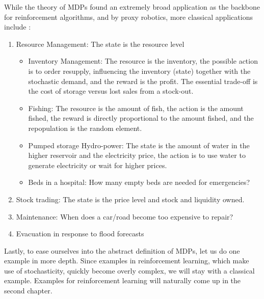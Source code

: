 While the theory of MDPs found an extremely broad application as the backbone for reinforcement algorithms, and by proxy robotics, more classical applications include \parencite{whiteRealApplicationsMarkov1985}:
\begin{enumerate}
	\item Resource Management: The state is the resource level
	\begin{itemize}
		\item Inventory Management: The resource is the inventory, the possible action is to order resupply, influencing the inventory (state) together with the stochastic demand, and the reward is the profit. The essential trade-off is the cost of storage versus lost sales from a stock-out.
		\item Fishing: The resource is the amount of fish, the action is the amount fished, the reward is directly proportional to the amount fished, and the repopulation is the random element.
		\item Pumped storage Hydro-power: The state is the amount of water in the higher reservoir and the electricity price, the action is to use water to generate electricity or wait for higher prices.
		\item Beds in a hospital: How many empty beds are needed for emergencies?
	\end{itemize}
	\item Stock trading: The state is the price level and stock and liquidity owned.
	\item Maintenance: When does a car/road become too expensive to repair?
	\item Evacuation in response to flood forecasts
\end{enumerate}
Lastly, to ease ourselves into the abstract definition of MDPs, let us do one example in more depth. Since examples in reinforcement learning, which make use of stochasticity, quickly become overly complex, we will stay with a classical example. Examples for reinforcement learning will naturally come up in the second chapter. 
